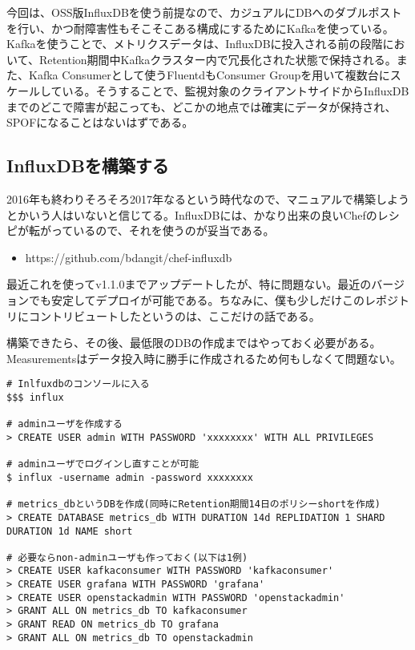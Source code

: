 今回は、OSS版InfluxDBを使う前提なので、カジュアルにDBへのダブルポストを行い、かつ耐障害性もそこそこある構成にするためにKafkaを使っている。Kafkaを使うことで、メトリクスデータは、InfluxDBに投入される前の段階において、Retention期間中Kafkaクラスター内で冗長化された状態で保持される。また、Kafka Consumerとして使うFluentdもConsumer Groupを用いて複数台にスケールしている。そうすることで、監視対象のクライアントサイドからInfluxDBまでのどこで障害が起こっても、どこかの地点では確実にデータが保持され、SPOFになることはないはずである。


\subsection{InfluxDBを構築する}
2016年も終わりそろそろ2017年なるという時代なので、マニュアルで構築しようとかいう人はいないと信じてる。InfluxDBには、かなり出来の良いChefのレシピが転がっているので、それを使うのが妥当である。


\begin{itemize}
	\item https://github.com/bdangit/chef-influxdb
\end{itemize}

最近これを使ってv1.1.0までアップデートしたが、特に問題ない。最近のバージョンでも安定してデプロイが可能である。ちなみに、僕も少しだけこのレポジトリにコントリビュートしたというのは、ここだけの話である。

構築できたら、その後、最低限のDBの作成まではやっておく必要がある。Measurementsはデータ投入時に勝手に作成されるため何もしなくて問題ない。


\begin{lstlisting}
# Inlfuxdbのコンソールに入る
$$$ influx

# adminユーザを作成する
> CREATE USER admin WITH PASSWORD 'xxxxxxxx' WITH ALL PRIVILEGES

# adminユーザでログインし直すことが可能
$ influx -username admin -password xxxxxxxx

# metrics_dbというDBを作成(同時にRetention期間14日のポリシーshortを作成)
> CREATE DATABASE metrics_db WITH DURATION 14d REPLIDATION 1 SHARD DURATION 1d NAME short

# 必要ならnon-adminユーザも作っておく(以下は1例)
> CREATE USER kafkaconsumer WITH PASSWORD 'kafkaconsumer'
> CREATE USER grafana WITH PASSWORD 'grafana'
> CREATE USER openstackadmin WITH PASSWORD 'openstackadmin'
> GRANT ALL ON metrics_db TO kafkaconsumer
> GRANT READ ON metrics_db TO grafana
> GRANT ALL ON metrics_db TO openstackadmin
\end{lstlisting}

